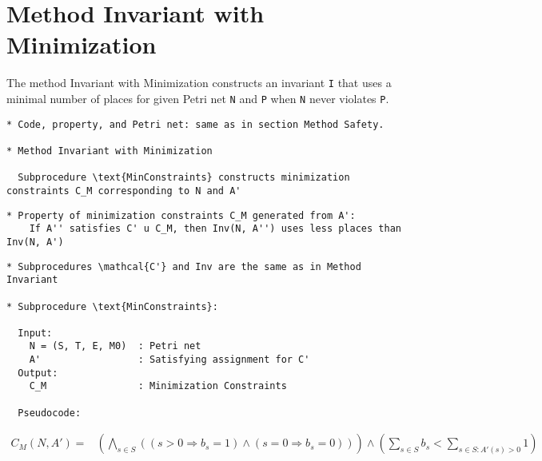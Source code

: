 \newpage

\section{Method Invariant with Minimization}

The method Invariant with Minimization constructs an invariant \verb=I=
that uses a minimal number of places for given Petri net \verb=N= and
\verb=P= when \verb=N= never violates \verb=P=. 

\begin{verbatim}
* Code, property, and Petri net: same as in section Method Safety.

* Method Invariant with Minimization

  Subprocedure \text{MinConstraints} constructs minimization constraints C_M corresponding to N and A'
\end{verbatim}




\begin{verbatim}
* Property of minimization constraints C_M generated from A': 
    If A'' satisfies C' u C_M, then Inv(N, A'') uses less places than Inv(N, A')
\end{verbatim}

\newpage

\begin{verbatim}
* Subprocedures \mathcal{C'} and Inv are the same as in Method Invariant

* Subprocedure \text{MinConstraints}:

  Input:
    N = (S, T, E, M0)  : Petri net
    A'                 : Satisfying assignment for C'
  Output:
    C_M                : Minimization Constraints

  Pseudocode:

\end{verbatim}

\begin{align*}
  C_M(N, A') =& \left( \bigwedge_{s \in S} \left(
      (s > 0 \Rightarrow b_s = 1) \land (s = 0 \Rightarrow b_s = 0)
    \right) \right) \land
    \left( \sum_{s \in S} b_s < \sum_{s \in S : A'(s) > 0} 1 \right)
\end{align*}

\newpage

